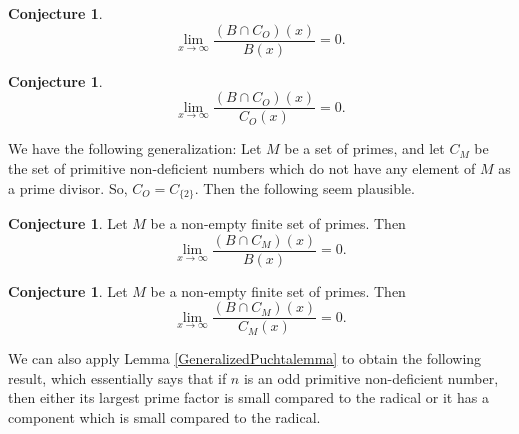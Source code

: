 \documentclass[12pt,reqno]{article}
\theoremstyle{plain}
\theoremstyle{definition}
\newtheorem{conjecture}[theorem]{Conjecture}
\theoremstyle{remark}
\begin{document}
\begin{conjecture}
$$\lim_{x \rightarrow \infty} \frac{(B \cap C_O)(x)}{B(x)}=0.$$
\end{conjecture}
\begin{conjecture}
$$\lim_{x \rightarrow \infty} \frac{(B \cap C_O)(x)}{C_O(x)}=0.$$
\end{conjecture}

We have the following generalization: Let $M$ be a set of primes, and let $C_M$ be the set of primitive non-deficient numbers which do not have any element of $M$ as a prime divisor. So, $C_O = C_{\{2\}}$. Then the following seem plausible.


\begin{conjecture} Let $M$ be a non-empty finite set of primes. Then
$$\lim_{x \rightarrow \infty} \frac{(B \cap C_M)(x)}{B(x)}=0.$$ \label{StrongversionforM1}
\end{conjecture}
\begin{conjecture} Let $M$ be a non-empty finite set of primes. Then \label{StrongversionforM2}
$$\lim_{x \rightarrow \infty} \frac{(B \cap C_M)(x)}{C_M(x)}=0.$$
\end{conjecture}


We can also apply Lemma \ref{GeneralizedPuchtalemma} to obtain the following result, which essentially says that if $n$ is an odd primitive non-deficient number, then either its largest prime factor is small compared to the radical or it has a component which is small compared to the radical.
\end{document}
